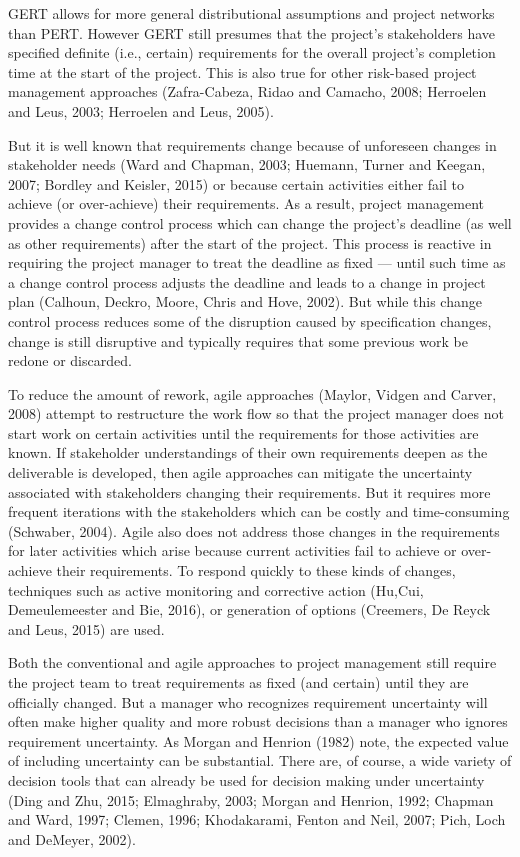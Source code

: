 \documentclass[11pt]{article}
\begin{document}
         GERT allows for more general distributional assumptions and project networks than PERT.  However GERT still presumes that the project's stakeholders have specified definite (i.e., certain) requirements for the overall project's completion time at the start of the project. This is also true for other risk-based project management approaches (Zafra-Cabeza, Ridao and Camacho, 2008; Herroelen and Leus, 2003; Herroelen and Leus, 2005).  \par
         But it is well known that requirements change because of unforeseen changes in stakeholder needs (Ward and Chapman, 2003; Huemann, Turner and Keegan, 2007; Bordley and Keisler, 2015) or because certain activities either fail to achieve (or over-achieve) their requirements.   
         As a result, project management provides a change control process which can change the project's deadline (as well as other requirements) after the start of the project.  This process is reactive in requiring the project manager to treat the deadline as fixed --- until such time as a change control process adjusts the deadline and leads to a change in project plan (Calhoun, Deckro, Moore, Chris and Hove, 2002). But while this change control process reduces some of the disruption caused by specification changes,  change is still disruptive and typically requires that some previous work be redone or discarded. \par To reduce the amount of rework, agile approaches (Maylor,  Vidgen and Carver, 2008) attempt to restructure the work flow so that the project manager does not start work on certain activities until the requirements for those activities are known. If stakeholder understandings of their own requirements deepen as the deliverable is developed, then agile approaches can mitigate the uncertainty associated with stakeholders changing their requirements.   But it requires more frequent iterations with the stakeholders which can be costly and time-consuming (Schwaber, 2004). Agile also does not address those changes in the requirements for later activities which arise because current activities fail to achieve or over-achieve their requirements. To respond quickly to these kinds of changes,  techniques such as active monitoring and corrective action (Hu,Cui, Demeulemeester and Bie, 2016), or generation of options (Creemers, De Reyck and Leus, 2015) are used.
         \par
          Both the conventional and agile approaches to project management still require the project team to treat requirements as fixed (and certain) until they are officially changed. But a manager who recognizes requirement uncertainty will often make higher quality and more robust decisions than a manager who ignores requirement uncertainty.   As Morgan and Henrion (1982) note, the expected value of including uncertainty can be substantial.  There are, of course, a wide variety of decision tools that can already be used for decision making under uncertainty (Ding and Zhu, 2015; Elmaghraby, 2003; Morgan and Henrion, 1992;  Chapman and Ward, 1997; Clemen, 1996; Khodakarami, Fenton and Neil, 2007; Pich, Loch and DeMeyer, 2002).  
\end{document}
